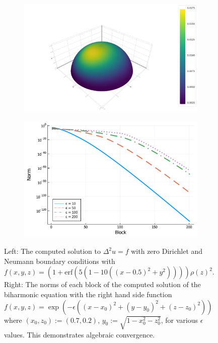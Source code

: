 \documentclass[11pt, oneside]{article}   	%
\begin{document}
\begin{figure}[tp]
	\centering
	\begin{subfigure}{0.85\textwidth}
		\includegraphics[scale=0.4]{biharmonic-f=erf-N=80-n=50}
	\end{subfigure}
	\hfill%
	
	\begin{subfigure}{0.55\textwidth}
		\includegraphics[scale=0.4]{solutionblocknorms-biharmonic-expfun-N=200}
	\end{subfigure}
	\hfill%
	\caption{Left: The computed solution to $\Delta^2 u = f$ with zero Dirichlet and Neumann boundary conditions with $f(x,y,z) = (1 + \text{erf}(5(1 - 10((x - 0.5)^2 + y^2)))) \rho(z)^2$. Right: The norms of each block of the computed solution of the biharmonic equation with the right hand side function $f(x,y,z) = \exp(-\epsilon((x-x_0)^2 + (y-y_0)^2 + (z-z_0)^2))$ where  $(x_0, z_0) := (0.7, 0.2)$, $y_0 := \sqrt{1 - x_0^2 - z_0^2}$, for various $\epsilon$ values. This demonstrates algebraic convergence.}
	\label{fig:biharmonic}
\end{figure}
\end{document}
